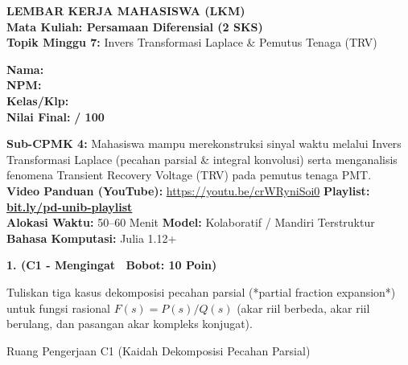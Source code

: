 \documentclass[10pt,a4paper]{article}
\begin{document}
\noindent\begin{minipage}[c]{0.68\textwidth}%
  {\large\textbf{\color{unibblue}LEMBAR KERJA MAHASISWA (LKM)}}\\[1mm]
  {\normalsize\textbf{Mata Kuliah: Persamaan Diferensial (2 SKS)}}\\[0.5mm]
  {\small\textbf{Topik Minggu 7:} Invers Transformasi Laplace \& Pemutus Tenaga (TRV)}%
\end{minipage}%
\hfill%
\begin{minipage}[c]{0.30\textwidth}%
  \begin{tcolorbox}[colback=unibblue!5,colframe=unibblue,boxrule=0.6pt,arc=2pt,left=4pt,right=4pt,top=2pt,bottom=2pt]
    \scriptsize
    \textbf{Nama:} \dotfill\\[1.2mm]
    \textbf{NPM:} \dotfill\\[1.2mm]
    \textbf{Kelas/Klp:} \dotfill\\[1.2mm]
    \textbf{Nilai Final:} \hfill \textbf{/ 100}
  \end{tcolorbox}%
\end{minipage}\par

\vspace{1.5mm}

\begin{tcolorbox}[colback=boxbg,colframe=unibgold!90!black,boxrule=0.6pt,arc=2pt,left=5pt,right=5pt,top=3pt,bottom=3pt,title=\textbf{\scriptsize Capaian Pembelajaran (Sub-CPMK 4) \& Pedoman Evaluasi OBE}]
  \scriptsize
  \textbf{Sub-CPMK 4:} Mahasiswa mampu merekonstruksi sinyal waktu melalui Invers Transformasi Laplace (pecahan parsial \& integral konvolusi) serta menganalisis fenomena Transient Recovery Voltage (TRV) pada pemutus tenaga PMT.\\
  \textbf{Video Panduan (YouTube):} \url{https://youtu.be/crWRyniSoi0} \hfill \textbf{Playlist:} \href{https://www.youtube.com/playlist?list=PLS5oOZWXZeTw}{\color{unibblue}\textbf{bit.ly/pd-unib-playlist}}\\\textbf{Alokasi Waktu:} 50--60 Menit \quad\textbar\quad \textbf{Model:} Kolaboratif / Mandiri Terstruktur \quad\textbar\quad \textbf{Bahasa Komputasi:} Julia 1.12+
\end{tcolorbox}

\vspace{1mm}

\noindent\textbf{1. (C1 - Mengingat \textbar\ Bobot: 10 Poin)}\par\vspace{0.5mm}
{\footnotesize Tuliskan tiga kasus dekomposisi pecahan parsial (*partial fraction expansion*) untuk fungsi rasional $F(s) = P(s)/Q(s)$ (akar riil berbeda, akar riil berulang, dan pasangan akar kompleks konjugat).}
\begin{answerbox}{Ruang Pengerjaan C1 (Kaidah Dekomposisi Pecahan Parsial)}
  \vspace{2.0cm}
\end{answerbox}
\end{document}
